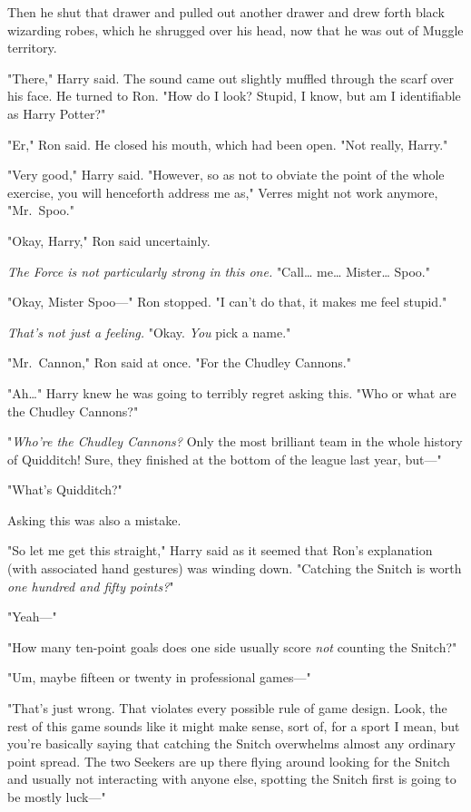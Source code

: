 Then he shut that drawer and pulled out another drawer and drew forth black 
wizarding robes, which he shrugged over his head, now that he was out of Muggle 
territory.

"There," Harry said. The sound came out slightly muffled through the scarf over 
his face. He turned to Ron. "How do I look? Stupid, I know, but am I 
identifiable as Harry Potter?"

"Er," Ron said. He closed his mouth, which had been open. "Not really, Harry."

"Very good," Harry said. "However, so as not to obviate the point of the whole 
exercise, you will henceforth address me as," Verres might not work anymore, 
"Mr.~Spoo."

"Okay, Harry," Ron said uncertainly.

\emph{The Force is not particularly strong in this one.} "Call{\ldots} 
me{\ldots} Mister{\ldots} Spoo."

"Okay, Mister Spoo---" Ron stopped. "I can't do that, it makes me feel stupid."

\emph{That's not just a feeling.} "Okay. \emph{You} pick a name."

"Mr.~Cannon," Ron said at once. "For the Chudley Cannons."

"Ah{\ldots}" Harry knew he was going to terribly regret asking this. "Who or 
what are the Chudley Cannons?"

"\emph{Who're the Chudley Cannons?} Only the most brilliant team in the whole 
history of Quidditch! Sure, they finished at the bottom of the league last 
year, but---"

"What's Quidditch?"

Asking this was also a mistake.

"So let me get this straight," Harry said as it seemed that Ron's explanation 
(with associated hand gestures) was winding down. "Catching the Snitch is worth 
\emph{one hundred and fifty points?}"

"Yeah---"

"How many ten-point goals does one side usually score \emph{not} counting the 
Snitch?"

"Um, maybe fifteen or twenty in professional games---"

"That's just wrong. That violates every possible rule of game design. Look, the 
rest of this game sounds like it might make sense, sort of, for a sport I mean, 
but you're basically saying that catching the Snitch overwhelms almost any 
ordinary point spread. The two Seekers are up there flying around looking for 
the Snitch and usually not interacting with anyone else, spotting the Snitch 
first is going to be mostly luck---"

